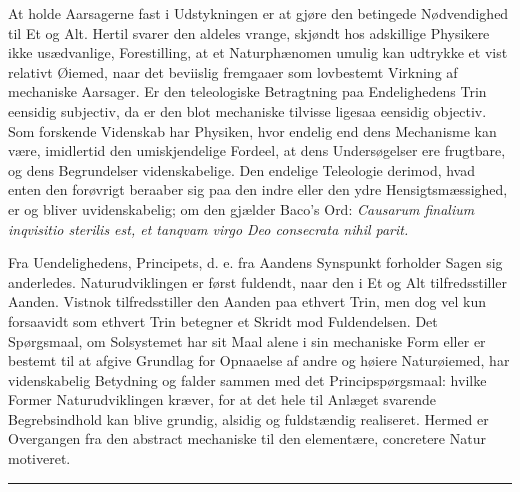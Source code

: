 \documentclass[12pt,a4paper]{book}
\newcommand{\streg}{\begin{center}\rule{2cm}{0.4pt}\end{center}}
\begin{document}
At holde Aarsagerne fast i Udstykningen er at gjøre den betingede Nødvendighed
til Et og Alt. Hertil svarer den aldeles vrange, skjøndt hos adskillige
Physikere ikke
usædvanlige, Forestilling, at et Naturphænomen umulig kan udtrykke et vist
relativt Øiemed, naar det beviislig fremgaaer som lovbestemt Virkning af
mechaniske Aarsager. Er den teleologiske Betragtning paa Endelighedens Trin
eensidig subjectiv, da er den blot mechaniske tilvisse ligesaa eensidig
objectiv. Som forskende Videnskab har Physiken, hvor endelig end dens
Mechanisme kan være, imidlertid den umiskjendelige Fordeel, at dens
Undersøgelser ere frugtbare, og dens Begrundelser videnskabelige. Den endelige
Teleologie derimod, hvad enten den forøvrigt beraaber sig paa den indre eller
den ydre Hensigtsmæssighed, er og bliver uvidenskabelig; om den gjælder Baco's
Ord: \textit{Causarum finalium inqvisitio sterilis est, et tanqvam virgo Deo
consecrata nihil parit.}

Fra Uendelighedens, Principets, d. e. fra Aandens Synspunkt forholder Sagen sig
anderledes. Naturudviklingen er først fuldendt, naar den i Et og Alt
tilfredsstiller Aanden. Vistnok tilfredsstiller den Aanden paa ethvert Trin,
men dog vel kun forsaavidt som ethvert Trin betegner et Skridt mod
Fuldendelsen. Det Spørgsmaal, om Solsystemet har sit Maal alene i sin
mechaniske Form eller er bestemt til at afgive Grundlag for Opnaaelse af andre
og høiere Naturøiemed, har videnskabelig Betydning og falder sammen med det
Principspørgsmaal: hvilke Former Naturudviklingen kræver, for at det hele til
Anlæget svarende Begrebsindhold kan blive grundig, alsidig og fuldstændig
realiseret. Hermed er Overgangen fra den abstract mechaniske til den
elementære, concretere Natur motiveret.

\streg
\end{document}
